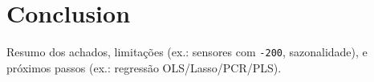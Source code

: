 \section{Conclusion}
Resumo dos achados, limitações (ex.: sensores com \texttt{-200}, sazonalidade), e próximos passos (ex.: regressão OLS/Lasso/PCR/PLS).
